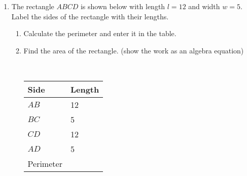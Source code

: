 \documentclass[12pt, twoside]{article}
\begin{document}
\begin{enumerate}
\newpage
  \item The rectangle $ABCD$ is shown below with length $l=12$ and width $w=5$. Label the sides of the rectangle with their lengths.
  \begin{enumerate}
    \item Calculate the perimeter and enter it in the table.
    \item Find the area of the rectangle. (show the work as an algebra equation)
    \begin{multicols}{2}
      \\
      \renewcommand{\arraystretch}{1.5}
      \begin{flushright}
      \begin{tabular}{|p{2cm}|p{2cm}|}
        \hline
        Side & Length \\
        \hline \hline
        $AB$ & 12 \\
        \hline
        $BC$ & 5 \\
        \hline
        $CD$ & 12 \\
        \hline
        $AD$ & 5 \\
        \hline \hline
        Perimeter & \\
        \hline
      \end{tabular}
    \end{flushright}
    \end{multicols}
  \end{enumerate} \vspace{1cm}


\end{enumerate}
\end{document}
